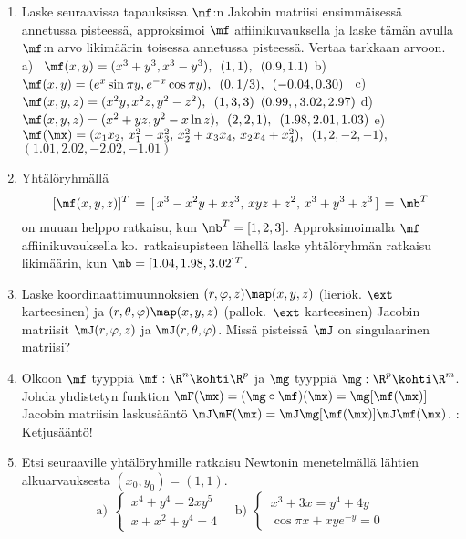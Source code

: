 \Harj
\begin{enumerate}

\item
Laske seuraavissa tapauksissa $\mf$:n Jakobin matriisi ensimmäisessä annetussa pisteessä,
approksimoi $\mf$ affiinikuvauksella ja laske tämän avulla $\mf$:n arvo likimäärin toisessa
annetussa pisteessä. Vertaa tarkkaan arvoon. \vspace{1mm}\newline
a) \   $\mf(x,y)=(x^3+y^3,x^3-y^3),\,\ (1,1),\,\ (0.9,1.1)$ \newline
b) \   $\mf(x,y)=(e^x\sin\pi y,e^{-x}\cos\pi y),\,\ (0,1/3),\,\ (-0.04,0.30)$ \newline
c) \,\ $\mf(x,y,z)=(x^2y,x^2z,y^2-z^2),\,\ (1,3,3)\,\ (0.99,,3.02,2.97)$ \newline
d) \   $\mf(x,y,z)=(x^2+yz,y^2-x\ln z),\,\ (2,2,1),\,\ (1.98,2.01,1.03)$ \newline
e) \,\ $\mf(\mx)=(x_1x_2,\,x_1^2-x_3^2,\,x_2^2+x_3x_4,\,x_2x_4+x_4^2),\,\ (1,2,-2,-1),$ \newline 
       \phantom{e \,\ }  $(1.01,2.02,-2.02,-1.01)$
 
\item 
Yhtälöryhmällä
\[
[\mf(x,y,z)]^T \,=\, [\,x^3 - x^2 y + x z^3,\,xyz + z^2,\,x^3 + y^3 + z^3\,] \,=\, \mb^T
\]
on muuan helppo ratkaisu, kun $\mb^T=[1,2,3]$. Approksimoimalla $\mf$ affiinikuvauksella ko.\ 
ratkaisupisteen lähellä laske yhtälöryhmän ratkaisu likimäärin, kun $\mb=[1.04,1.98,3.02]^T$.

\item
Laske koordinaattimuunnoksien $(r,\varphi,z)\map(x,y,z)$ (lieriök. $\ext$ karteesinen) ja 
$(r,\theta,\varphi)\map(x,y,z)$ (pallok.\ $\ext$ karteesinen) Jacobin matriisit 
$\mJ(r,\varphi,z)$ ja $\mJ(r,\theta,\varphi)$. Missä pisteissä $\mJ$ on singulaarinen matriisi?

\item
Olkoon $\mf$ tyyppiä $\mf: \R^n\kohti\R^p$ ja $\mg$ tyyppiä $\mg: \R^p\kohti\R^m$. Johda
yhdistetyn funktion $\mF(\mx)=(\mg\circ\mf)(\mx)=\mg[\mf(\mx)]$ Jacobin matriisin laskusääntö
$\mJ\mF(\mx)=\mJ\mg[\mf(\mx)]\mJ\mf(\mx)$. \kor{Vihje}: Ketjusääntö!

\item
Etsi seuraaville yhtälöryhmille ratkaisu Newtonin menetelmällä lähtien alkuarvauksesta
$(x_0,y_0)=(1,1)$.
\[
\text{a)}\,\ \begin{cases} \,x^4+y^4=2xy^5\\ \,x+x^2+y^4=4 \end{cases} \quad
\text{b)}\,\ \begin{cases} \,x^3+3x=y^4+4y \\ \,\cos\pi x+xye^{-y}=0 \end{cases}
\]


\end{enumerate}
